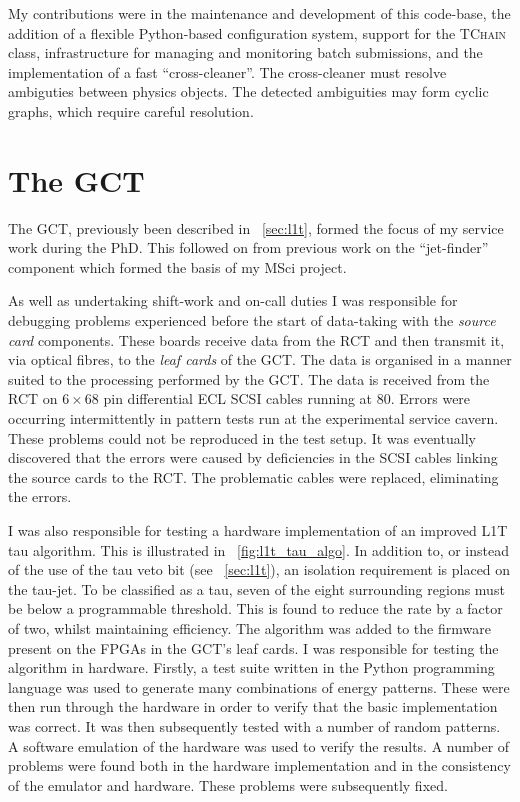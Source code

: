 My contributions were in the maintenance and development of this code-base, the
addition of a flexible Python-based configuration system, support for the \root
\textsc{TChain} class, infrastructure for managing and monitoring batch
submissions, and the implementation of a fast ``cross-cleaner''. The
cross-cleaner must resolve ambiguties between physics objects. The detected
ambiguities may form cyclic graphs, which require careful resolution.

\section{The \acl{GCT}}
\label{sec:gct}
The \ac{GCT}, previously been described in \sec~\ref{sec:l1t}, formed the focus
of my service work during the PhD. This followed on from previous work on the
``jet-finder'' component which formed the basis of my MSci project.

As well as undertaking shift-work and on-call duties I was responsible for
debugging problems experienced before the start of data-taking with the
\emph{source card} components. These boards receive data from the \ac{RCT} and
then transmit it, via optical fibres, to the \emph{leaf cards} of the
\ac{GCT}. The data is organised in a manner suited to the processing performed
by the \ac{GCT}. The data is received from the \ac{RCT} on $6\times 68$ pin
differential \ac{ECL} \ac{SCSI} cables running at \unit{80}{\mega\hertz}. Errors
were occurring intermittently in pattern tests run at the experimental service
cavern. These problems could not be reproduced in the test setup. It was
eventually discovered that the errors were caused by deficiencies in the
\ac{SCSI} cables linking the source cards to the \ac{RCT}. The problematic
cables were replaced, eliminating the errors.

I was also responsible for testing a hardware implementation of an improved
\ac{L1T} tau algorithm. This is illustrated in \fig~\ref{fig:l1t_tau_algo}. In
addition to, or instead of the use of the tau veto bit (see \sec~\ref{sec:l1t}),
an isolation requirement is placed on the tau-jet. To be classified as a tau,
seven of the eight surrounding regions must be below a programmable
threshold. This is found to reduce the rate by a factor of two, whilst
maintaining efficiency. The algorithm was added to the firmware present on the
\acp{FPGA} in the \ac{GCT}'s leaf cards. I was responsible for testing the
algorithm in hardware. Firstly, a test suite written in the Python programming
language was used to generate many combinations of energy patterns. These were
then run through the hardware in order to verify that the basic implementation
was correct. It was then subsequently tested with a number of random patterns. A
software emulation of the hardware was used to verify the results. A number of
problems were found both in the hardware implementation and in the consistency
of the emulator and hardware. These problems were subsequently fixed.

